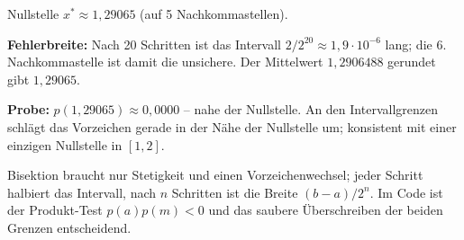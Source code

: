 \begin{ergebnis}
Nullstelle $x^*\approx\boxed{1{,}29065}$ (auf 5 Nachkommastellen).
\end{ergebnis}

\begin{kontrolle}
\textbf{Fehlerbreite:} Nach 20 Schritten ist das Intervall
$2/2^{20}\approx1{,}9\cdot10^{-6}$ lang; die 6. Nachkommastelle ist damit
die unsichere. Der Mittelwert $1{,}2906488$ gerundet gibt $1{,}29065$.
\checkmark

\textbf{Probe:} $p(1{,}29065)\approx0{,}0000$ -- nahe der Nullstelle. An
den Intervallgrenzen schlägt das Vorzeichen gerade in der Nähe der
Nullstelle um; konsistent mit einer einzigen Nullstelle in $[1,2]$.
\checkmark
\end{kontrolle}

\begin{merksatz}
Bisektion braucht nur Stetigkeit und einen Vorzeichenwechsel; jeder Schritt
halbiert das Intervall, nach $n$ Schritten ist die Breite
$(b-a)/2^n$. Im Code ist der Produkt-Test $p(a)p(m)<0$ und das saubere
Überschreiben der beiden Grenzen entscheidend.
\end{merksatz}
